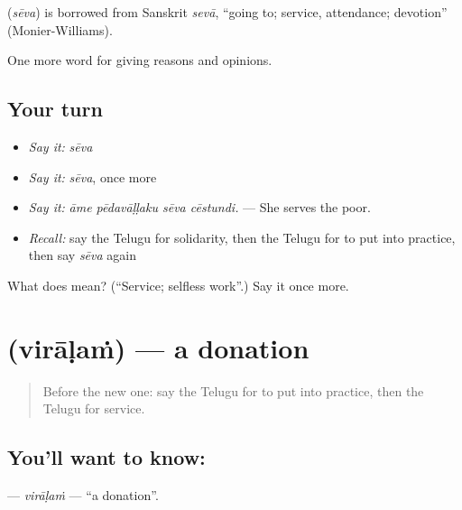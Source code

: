 \begin{cousinweb}
\textbf{} (\emph{sēva}) is borrowed from Sanskrit \emph{sevā}, \textquotedblleft{}going to; service, attendance; devotion\textquotedblright{} (Monier-Williams).
\end{cousinweb}

\begin{grammarlens}[title={What you've built}]
One more word for giving reasons and opinions.
\end{grammarlens}

\subsection*{Your turn}
\begin{itemize}
\raggedright
  \item \emph{Say it:} \emph{sēva}
  \item \emph{Say it:} \emph{sēva}, once more
  \item \emph{Say it:} \emph{āme pēdavāḷḷaku sēva cēstundi.} — She serves the poor.
  \item \emph{Recall:} say the Telugu for solidarity, then the Telugu for to put into practice, then say \emph{sēva} again
\end{itemize}

\begin{tcolorbox}[breakable,colback=teal!4,colframe=teal!35!black,title={Before you move on}]
What does  mean? (\textquotedblleft{}Service; selfless work\textquotedblright{}.) Say it once more.
\end{tcolorbox}
\section[\texorpdfstring{\te{విరాళం} (virāḷaṁ)}{విరాళం (virāḷaṁ)}]{ (virāḷaṁ) — a donation}

\label{lesson:TE-C410-viralam}



\begin{quote}
Before the new one: say the Telugu for to put into practice, then the Telugu for service.
\end{quote}

\subsection*{You'll want to know: }
\textbf{} — \emph{virāḷaṁ} — \textquotedblleft{}a donation\textquotedblright{}.

